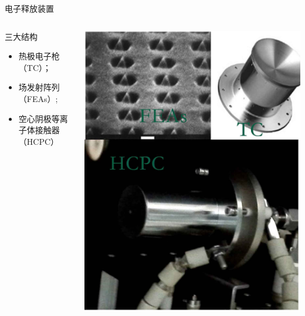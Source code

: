 \documentclass[sectioncirclenumberstyle]{le2iutbmbeamer}
\begin{document}
\begin{frame}[c]{电子释放装置}
\begin{columns}
\begin{column}{.5\linewidth}
\begin{block}{三大结构}
\begin{itemize}
\item 热极电子枪（TC）；
\item 场发射阵列（FEAs）;
\item \alert{空心阴极等离子体接触器（HCPC）}
\end{itemize}
\end{block}
\end{column}%
\hfil
\begin{column}{.5\linewidth}

\centering
\includegraphics[width=\linewidth]{figures/emitter}
\end{column}
\end{columns}
\end{frame}
\end{document}
